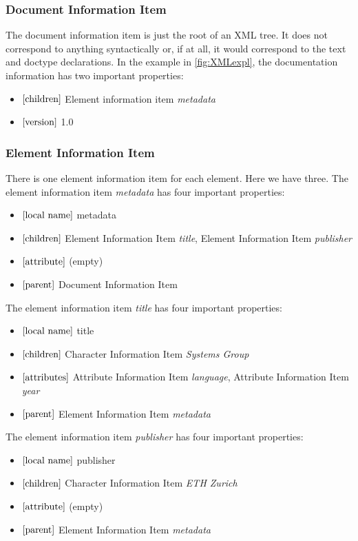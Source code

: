 \subsubsection{Document Information Item}
The document information item is just the root of an XML tree. It does not correspond to anything syntactically or, if at all, it would correspond to the text and doctype declarations. In the example in \cref{fig:XMLexpl}, the documentation information has two important properties:
\begin{itemize}
    \item $\left[ \text{children} \right]$ Element information item \textit{metadata}
    \item $\left[ \text{version} \right]$ 1.0
\end{itemize}

\subsubsection{Element Information Item}
There is one element information item for each element. Here we have three.
The element information item \textit{metadata} has four important properties:
\begin{itemize}
    \item $\left[ \text{local name} \right]$ metadata
    \item $\left[ \text{children} \right]$ Element Information Item \textit{title}, Element Information Item \textit{publisher}
    \item $\left[ \text{attribute} \right]$ (empty)
    \item $\left[ \text{parent} \right]$ Document Information Item
\end{itemize}
The element information item \textit{title} has four important properties:
\begin{itemize}
    \item $\left[ \text{local name} \right]$ title
    \item $\left[ \text{children} \right]$ Character Information Item \textit{Systems Group}
    \item $\left[ \text{attributes} \right]$ Attribute Information Item \textit{language}, Attribute Information Item \textit{year}
    \item $\left[ \text{parent} \right]$ Element Information Item \textit{metadata}
\end{itemize}
The element information item \textit{publisher} has four important properties:
\begin{itemize}
    \item $\left[ \text{local name} \right]$ publisher
    \item $\left[ \text{children} \right]$ Character Information Item \textit{ETH Zurich}
    \item $\left[ \text{attribute} \right]$ (empty)
    \item $\left[ \text{parent} \right]$ Element Information Item \textit{metadata}
\end{itemize}

